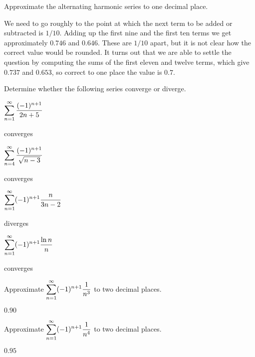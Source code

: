 \begin{example}
\label{example:approximate-alternating-harmonic-series}
Approximate the alternating harmonic series to one decimal place.
\end{example}
\begin{solution}
We need to go roughly to the point at which the next term to be added
or subtracted is $1/10$. Adding up the first nine and the first ten
terms we get approximately $0.746$ and $0.646$. These are $1/10$
apart, but it is not clear how the correct value would be rounded. It
turns out that we are able to settle the question by computing the
sums of the first eleven and twelve terms, which give
$0.737$ and $0.653$, so correct to one place the value is $0.7$.
\end{solution}


\begin{exercises}

Determine whether the following series converge or diverge.

\twocol

\begin{exercise} $\displaystyle\sum_{n=1}^\infty {(-1)^{n+1}\over 2n+5}$
\begin{answer} converges
\end{answer}\end{exercise}

\begin{exercise} $\displaystyle\sum_{n=4}^\infty {(-1)^{n+1}\over \sqrt{n-3}}$
\begin{answer} converges
\end{answer}\end{exercise}

\begin{exercise} $\displaystyle\sum_{n=1}^\infty (-1)^{n+1}{n\over 3n-2}$
\begin{answer} diverges
\end{answer}\end{exercise}

\begin{exercise} $\displaystyle\sum_{n=1}^\infty (-1)^{n+1}{\ln n\over n}$
\begin{answer} converges
\end{answer}\end{exercise}
\endtwocol

\begin{exercise} Approximate $\displaystyle\sum_{n=1}^\infty (-1)^{n+1}{1\over n^3}$ to
two decimal places.
\begin{answer} $0.90$
\end{answer}\end{exercise}

\begin{exercise} Approximate $\displaystyle\sum_{n=1}^\infty (-1)^{n+1}{1\over n^4}$ to
two decimal places. 
\begin{answer} $0.95$
\end{answer}\end{exercise}

\end{exercises}

